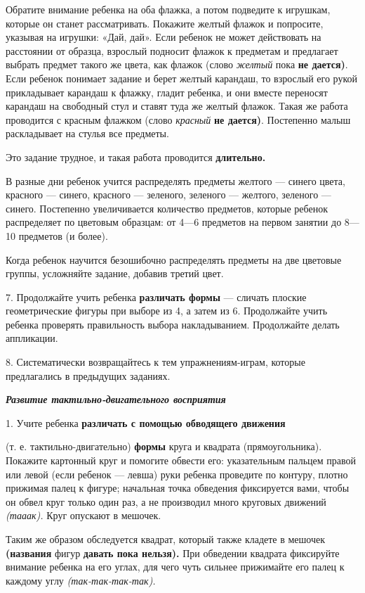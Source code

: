 \documentclass[a5paper]{book}
\renewcommand{\emph}[1]{\textit{#1}}
\begin{document}
Обратите внимание ребенка на оба флажка, а потом подведите к игрушкам,
которые он станет рассматривать. Покажите желтый флажок и попросите,
указывая на игрушки: «Дай, дай». Если ребенок не может действовать на
расстоянии от образца, взрослый подносит флажок к предметам и предлагает
выбрать предмет такого же цвета, как флажок (слово \emph{желтый} пока
\textbf{не дается)}. Если ребенок понимает задание и берет желтый
карандаш, то взрослый его рукой прикладывает карандаш к флажку, гладит
ребенка, и они вместе переносят карандаш на свободный стул и ставят туда
же желтый флажок. Такая же работа проводится с красным флажком (слово
\emph{красный} \textbf{не дается)}. Постепенно малыш раскладывает на
стулья все предметы.

Это задание трудное, и такая работа проводится \textbf{длительно.}

В разные дни ребенок учится распределять предметы желтого --- синего
цвета, красного --- синего, красного --- зеленого, зеленого --- желтого,
зеленого --- синего. Постепенно увеличивается количество предметов,
которые ребенок распределяет по цветовым образцам: от 4---6 предметов на
первом занятии до 8---10 предметов (и более).

Когда ребенок научится безошибочно распределять предметы на две цветовые
группы, усложняйте задание, добавив третий цвет.

7. Продолжайте учить ребенка \textbf{различать формы} --- сличать
плоские геометрические фигуры при выборе из 4, а затем из 6. Продолжайте
учить ребенка проверять правильность выбора накладыванием. Продолжайте
делать аппликации.

8. Систематически возвращайтесь к тем упражнениям-играм, которые
предлагались в предыдущих заданиях.

\emph{\textbf{Развитие тактильно-двигательного восприятия}}

1. Учите ребенка \textbf{различать с помощью обводящего движения}

(т. е. тактильно-двигательно) \textbf{формы} круга и квадрата
(прямоугольника). Покажите картонный круг и помогите обвести его:
указательным пальцем правой или левой (если ребенок --- левша) руки
ребенка проведите по контуру, плотно прижимая палец к фигуре; начальная
точка обведения фиксируется вами, чтобы он обвел круг только один раз, а
не производил много круговых движений \emph{(тааак).} Круг опускают в
мешочек.

Таким же образом обследуется квадрат, который также кладете в мешочек
\textbf{(названия} фигур \textbf{давать пока нельзя).} При обведении
квадрата фиксируйте внимание ребенка на его углах, для чего чуть сильнее
прижимайте его палец к каждому углу \emph{(так-так-так-так).}
\end{document}
